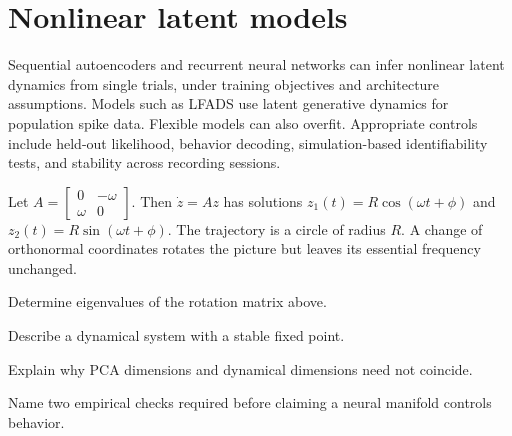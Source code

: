 \section{Nonlinear latent models}
Sequential autoencoders and recurrent neural networks can infer nonlinear latent dynamics from single trials, under training objectives and architecture assumptions. Models such as LFADS use latent generative dynamics for population spike data. Flexible models can also overfit. Appropriate controls include held-out likelihood, behavior decoding, simulation-based identifiability tests, and stability across recording sessions.

\begin{workedexample}
Let $A=\begin{bmatrix}0&-\omega\\\omega&0\end{bmatrix}$. Then $\dot z=Az$ has solutions $z_1(t)=R\cos(\omega t+\phi)$ and $z_2(t)=R\sin(\omega t+\phi)$. The trajectory is a circle of radius $R$. A change of orthonormal coordinates rotates the picture but leaves its essential frequency unchanged.
\end{workedexample}
\begin{exercises}
\item Determine eigenvalues of the rotation matrix above.
\item Describe a dynamical system with a stable fixed point.
\item Explain why PCA dimensions and dynamical dimensions need not coincide.
\item Name two empirical checks required before claiming a neural manifold controls behavior.
\end{exercises}
